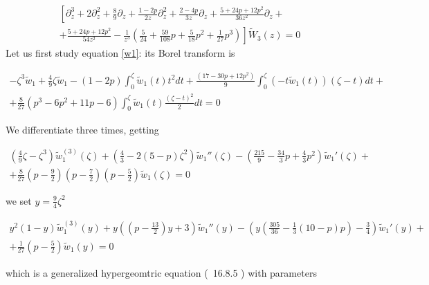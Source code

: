 \documentclass{article}
\begin{document}
\begin{multline}\label{w3}
\left[\partial_z^3+2\partial_z^2+\frac{8}{9}\partial_z+\frac{1-2p}{2z}\partial_z^2+\frac{2-4p}{3z}\partial_z+\frac{5+24p+12p^2}{36z^2}\partial_z+\right.\\
\left.+\frac{5+24p+12p^2}{54z^2}-\frac{1}{z^3}\left(\frac{5}{24}+\frac{59}{108}p+\frac{5}{18}p^2+\frac{1}{27}p^3\right)\right]\tilde{W}_3(z)=0
\end{multline}
Let us first study equation \eqref{w1}: its Borel transform is

\begin{multline*}
-\zeta^3\tilde{w}_1+\frac{4}{9}\zeta\tilde{w}_1-(1-2p)\int_0^\zeta\tilde{w}_1(t)t^2dt+\frac{(17-30p+12p^2)}{9}\int_0^\zeta(-t\tilde{w}_1(t))(\zeta-t)dt+\\
+\frac{8}{27}(p^3-6p^2+11p-6)\int_0^\zeta\tilde{w}_1(t)\frac{(\zeta-t)^2}{2}dt=0
\end{multline*}

We differentiate three times, getting 

\begin{multline*}
\left(\frac{4}{9}\zeta-\zeta^3\right)\tilde{w}_1^{(3)}(\zeta)+\left(\frac{4}{3}-2(5-p)\zeta^2\right)\tilde{w}_1''(\zeta)-\left(\frac{215}{9}-\frac{34}{3}p+\frac{4}{3}p^2\right)\tilde{w}_1'(\zeta)+\\
+\frac{8}{27}\left(p-\frac{9}{2}\right)\left(p-\frac{7}{2}\right)\left(p-\frac{5}{2}\right)\tilde{w}_1(\zeta)=0
\end{multline*}

we set $y=\tfrac{9}{4}\zeta^2$

\begin{multline}\label{eq:hw1}
y^2(1-y)\tilde{w}_1^{(3)}(y)+y\left(\left(p-\frac{13}{2}\right)y+3\right)\tilde{w}_1''(y)-\left(y\left(\frac{305}{36}-\frac{1}{3}(10-p)p\right)-\frac{3}{4}\right)\tilde{w}_1'(y)+\\
+\frac{1}{27}\left(p-\frac{5}{2}\right)\tilde{w}_1(y)=0
\end{multline}

which is a generalized hypergeomtric equation (~16.8.5 \cite{DLMF}) with parameters
\end{document}
